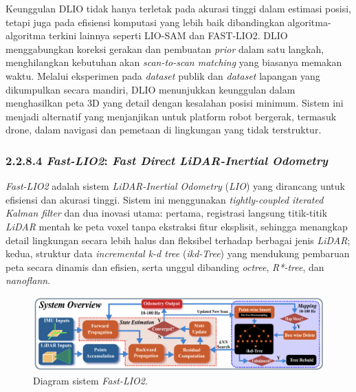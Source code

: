 Keunggulan DLIO tidak hanya terletak pada akurasi tinggi dalam estimasi posisi, tetapi juga pada efisiensi komputasi yang lebih baik dibandingkan algoritma-algoritma terkini lainnya seperti LIO-SAM dan FAST-LIO2. DLIO menggabungkan koreksi gerakan dan pembuatan \emph{prior} dalam satu langkah, menghilangkan kebutuhan akan \emph{scan-to-scan matching} yang biasanya memakan waktu. Melalui eksperimen pada \emph{dataset} publik dan \emph{dataset} lapangan yang dikumpulkan secara mandiri, DLIO menunjukkan keunggulan dalam menghasilkan peta 3D yang detail dengan kesalahan posisi minimum. Sistem ini menjadi alternatif yang menjanjikan untuk platform robot bergerak, termasuk drone, dalam navigasi dan pemetaan di lingkungan yang tidak terstruktur.



\subsubsection{2.2.8.4 \emph{Fast-LIO2}: \emph{Fast Direct LiDAR-Inertial Odometry}}

\emph{Fast-LIO2} adalah sistem \emph{LiDAR-Inertial Odometry} (\emph{LIO}) yang dirancang untuk efisiensi dan akurasi tinggi. Sistem ini menggunakan \emph{tightly-coupled iterated Kalman filter} dan dua inovasi utama: pertama, registrasi langsung titik-titik \emph{LiDAR} mentah ke peta voxel tanpa ekstraksi fitur eksplisit, sehingga menangkap detail lingkungan secara lebih halus dan fleksibel terhadap berbagai jenis \emph{LiDAR}; kedua, struktur data \emph{incremental k-d tree} (\emph{ikd-Tree}) yang mendukung pembaruan peta secara dinamis dan efisien, serta unggul dibanding \emph{octree}, \emph{R*-tree}, dan \emph{nanoflann}.

\begin{figure}[H]
    \centering
    \includegraphics[width=1\textwidth]{gambar/bab2/fast-lio2.png}
    \caption{Diagram sistem \emph{Fast-LIO2}. \cite{xu2022fastlio}}
    \label{fig:fastlio2}
\end{figure}


